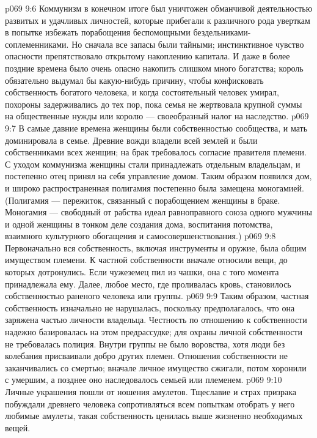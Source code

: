 \vs p069 9:6 \bibnobreakspace {} Коммунизм в конечном итоге был уничтожен обманчивой деятельностью развитых и удачливых личностей, которые прибегали к различного рода уверткам в попытке избежать порабощения беспомощными бездельниками\hyp{}соплеменниками. Но сначала все запасы были тайными; инстинктивное чувство опасности препятствовало открытому накоплению капитала. И даже в более поздние времена было очень опасно накопить слишком много богатства; король обязательно выдумал бы какую\hyp{}нибудь причину, чтобы конфисковать собственность богатого человека, и когда состоятельный человек умирал, похороны задерживались до тех пор, пока семья не жертвовала крупной суммы на общественные нужды или королю --- своеобразный налог на наследство.
\vs p069 9:7 В самые давние времена женщины были собственностью сообщества, и мать доминировала в семье. Древние вожди владели всей землей и были собственниками всех женщин; на брак требовалось согласие правителя племени. С уходом коммунизма женщины стали принадлежать отдельным владельцам, и постепенно отец принял на себя управление домом. Таким образом появился дом, и широко распространенная полигамия постепенно была замещена моногамией. (Полигамия --- пережиток, связанный с порабощением женщины в браке. Моногамия --- свободный от рабства идеал равноправного союза одного мужчины и одной женщины в тонком деле создания дома, воспитания потомства, взаимного культурного обогащения и самосовершенствования.)
\vs p069 9:8 Первоначально вся собственность, включая инструменты и оружие, была общим имуществом племени. К частной собственности вначале относили вещи, до которых дотронулись. Если чужеземец пил из чашки, она с того момента принадлежала ему. Далее, любое место, где проливалась кровь, становилось собственностью раненого человека или группы.
\vs p069 9:9 Таким образом, частная собственность изначально не нарушалась, поскольку предполагалось, что она заряжена частью личности владельца. Честность по отношению к собственности надежно базировалась на этом предрассудке; для охраны личной собственности не требовалась полиция. Внутри группы не было воровства, хотя люди без колебания присваивали добро других племен. Отношения собственности не заканчивались со смертью; вначале личное имущество сжигали, потом хоронили с умершим, а позднее оно наследовалось семьей или племенем.
\vs p069 9:10 Личные украшения пошли от ношения амулетов. Тщеславие и страх призрака побуждали древнего человека сопротивляться всем попыткам отобрать у него любимые амулеты, такая собственность ценилась выше жизненно необходимых вещей.
